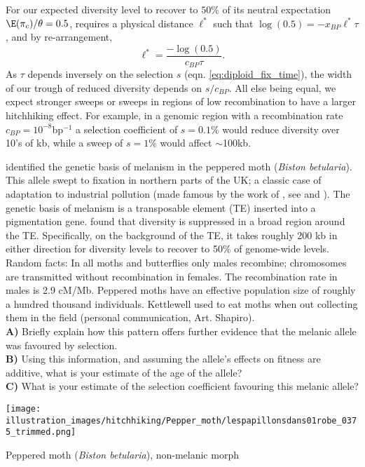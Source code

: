 For our expected diversity level to recover to $50\%$ of
its neutral expectation $\E(\pi_c)/\theta=0.5$, requires a physical
distance $\ell^{*}$ such that $\log(0.5) = -x_{BP} \ell ^*\tau$, and by re-arrangement,
\begin{equation}
\ell^* = \frac{-\log(0.5)}{c_{BP} \tau }.
\end{equation}
As
$\tau$ depends inversely on the selection $s$ (eqn. \eqref{eq:diploid_fix_time}), the width of our trough of reduced diversity depends on $s/c_{BP}$.
All else being equal, we expect stronger sweeps or sweeps in regions of low
recombination to have a larger hitchhiking effect. For example, in a genomic region with a recombination rate $c_{BP}=10^{-8}$bp$^{-1}$ a selection coefficient of $s=0.1\%$ would reduce
diversity over 10's of kb, while a sweep of $s=1\%$ would affect
$\sim$100kb.   \\



\begin{question}{}
\citet{van2011industrial}  identified the genetic basis of
melanism in the peppered moth ({\it Biston betularia}). This allele swept to fixation in northern
parts of the UK; a classic case of adaptation to industrial pollution
(made famous by the work of \citeauthor{kettlewell1955selection}, see
\citet{majerus2009industrial} and \citet{cook2012selective}). The genetic basis of melanism
is a transposable element (TE) inserted into a pigmentation gene. \citeauthor{van2011industrial} found that diversity is suppressed in a broad region
around the TE. Specifically, on the background of the TE, it takes
roughly 200 kb in either direction for diversity levels to recover to
50\% of genome-wide levels. \\

Random facts: In all moths and butterflies only males recombine;
chromosomes are transmitted without recombination in females. The
recombination rate in males is 2.9 cM/Mb.  Peppered moths have an
effective population size of roughly a hundred thousand
individuals. Kettlewell used to eat moths when out collecting them in
the field (personal communication, Art. Shapiro). \\
{\bf A)} Briefly explain how this pattern offers further evidence that the melanic allele was favoured by selection.\\
{\bf B)} Using this information, and assuming the allele's effects on fitness are additive, what is your estimate of the age of the allele? \\
{\bf C)} What is your estimate of the selection coefficient favouring this melanic allele?
\end{question}
\begin{marginfigure}[-3cm]
\begin{center}\texttt{[image: illustration\_images/hitchhiking/Pepper\_moth/lespapillonsdans01robe\_0375\_trimmed.png]}
\end{center}
\caption{Peppered moth ({\it Biston betularia}), non-melanic morph  } \label{Peppered_moth}
\end{marginfigure}

